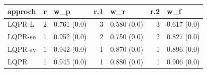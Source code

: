 \begin{tabular}{lrlrlrl}
\hline
 approch   &   r & w\_p         &   r.1 & w\_r         &   r.2 & w\_f         \\
\hline
 LQPR-L    &   2 & 0.761 (0.0) &     3 & 0.580 (0.0) &     3 & 0.617 (0.0) \\
 LQPR-se   &   1 & 0.952 (0.0) &     2 & 0.750 (0.0) &     2 & 0.827 (0.0) \\
 LQPR-sy   &   1 & 0.942 (0.0) &     1 & 0.870 (0.0) &     1 & 0.896 (0.0) \\
 LQPR      &   1 & 0.945 (0.0) &     1 & 0.880 (0.0) &     1 & 0.906 (0.0) \\
\hline
\end{tabular}